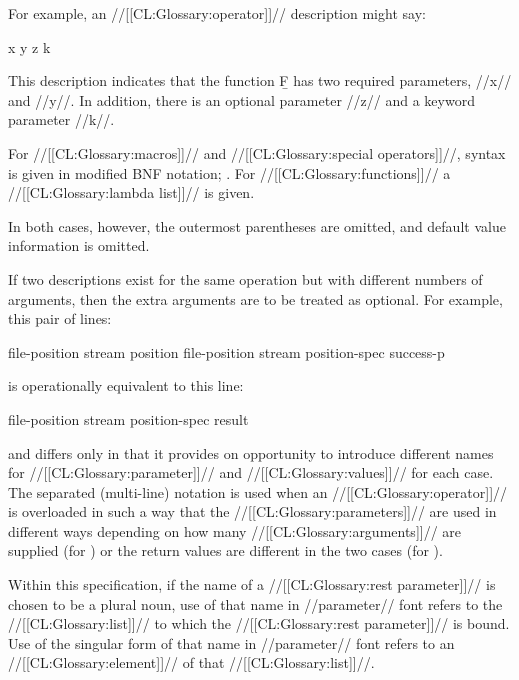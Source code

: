 For example, an //[[CL:Glossary:operator]]// description might say:

 {x y {\opt} z {\key} k}

\noindent This description indicates that the function \b{F}  has two required parameters, //x// and //y//.  In addition, there is an optional parameter //z// and a keyword parameter //k//.

For //[[CL:Glossary:macros]]// and //[[CL:Glossary:special operators]]//, syntax is given  in modified BNF notation; \seesection\ModifiedBNF. For //[[CL:Glossary:functions]]// a //[[CL:Glossary:lambda list]]// is given.

In both cases, however, the outermost parentheses are omitted, and default value information is omitted.


If two descriptions exist for the same operation but with different numbers of arguments, then the extra arguments are to be treated as optional.  For example, this pair of lines:

\DefunWithValues file-position {stream} {position} \DefunWithValues file-position {stream position-spec} {success-p}

\noindent is operationally equivalent to this line:

\DefunWithValues file-position {stream {\opt} position-spec} {result}

\noindent and differs only in that it provides on opportunity to introduce different names for //[[CL:Glossary:parameter]]// and //[[CL:Glossary:values]]// for each case. The separated (multi-line) notation is used when an //[[CL:Glossary:operator]]// is overloaded in such a way that the //[[CL:Glossary:parameters]]// are used in different ways depending on how many //[[CL:Glossary:arguments]]// are supplied (\eg for \thefunction{/}) or the return values are different in the two cases (\eg for ).

\endsubsubsubsection%


Within this specification,  if the name of a //[[CL:Glossary:rest parameter]]// is chosen to be a plural noun, use of that name in //parameter// font refers to the //[[CL:Glossary:list]]// to which the //[[CL:Glossary:rest parameter]]// is bound. Use of the singular form of that name in //parameter// font refers  to an //[[CL:Glossary:element]]// of that //[[CL:Glossary:list]]//.

